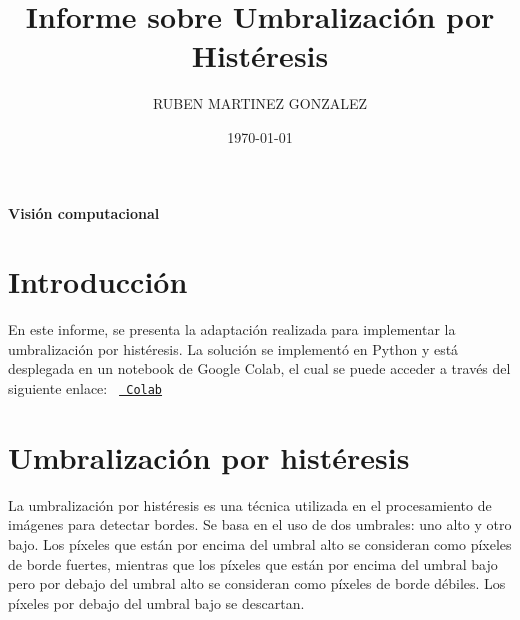 \documentclass[11pt]{article}
\title{Informe sobre Umbralización por Histéresis}
\author{RUBEN MARTINEZ GONZALEZ}
\date{\today}
\begin{document}
    \maketitle
    \begin{center}
        \textbf{Visión computacional}
    \end{center}


    \section{Introducción}
    \noindent
    En este informe, se presenta la adaptación realizada para implementar la umbralización por histéresis.
    \noindent
    La solución se implementó en Python y está desplegada en un notebook de Google Colab, el cual se puede acceder a través del siguiente enlace:
    \texttt{%
        \href{https://colab.research.google.com/drive/1jJnkRD_QYszGcF4tEZ0V2oYQkkZl8hcF?usp=sharing}{%
            Colab}%
    }


    \section{Umbralización por histéresis}
    La umbralización por histéresis es una técnica utilizada en el procesamiento de imágenes para detectar bordes.
    Se basa en el uso de dos umbrales: uno alto y otro bajo.
    Los píxeles que están por encima del umbral alto se consideran como píxeles de borde fuertes, mientras que los píxeles que están por encima
    del umbral bajo pero por debajo del umbral alto se consideran como píxeles de borde débiles. Los píxeles por debajo del umbral bajo se descartan.
\end{document}

